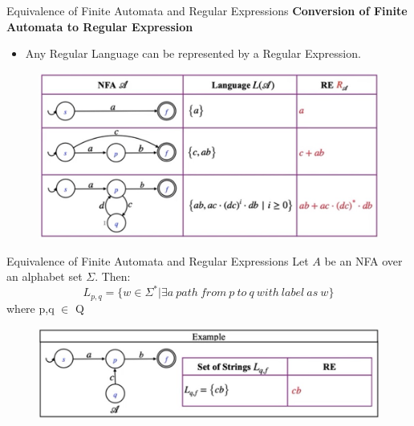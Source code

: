 \documentclass{beamer}
\begin{document}
\begin{frame}{Equivalence of Finite Automata and Regular Expressions}
	\textbf{Conversion of Finite Automata to Regular Expression}
	\begin{itemize}
		\item Any Regular Language can be represented by a Regular Expression.
	\end{itemize}
		\begin{figure}
		\includegraphics[scale=.5]{img2/m20}
	\end{figure}
\end{frame}
\begin{frame}{Equivalence of Finite Automata and Regular Expressions}
	Let $A$ be an NFA over an alphabet set $\Sigma$. Then:
	$$L_{p,q}=\{w\in\Sigma^* \big | \exists  a \ path\ from \ p \ to \ q\ with \ label \ as \ w\}$$ where p,q $\in$ Q
		\begin{figure}
		\includegraphics[scale=.5]{img2/m21}
	\end{figure}
\end{frame}
\end{document}
